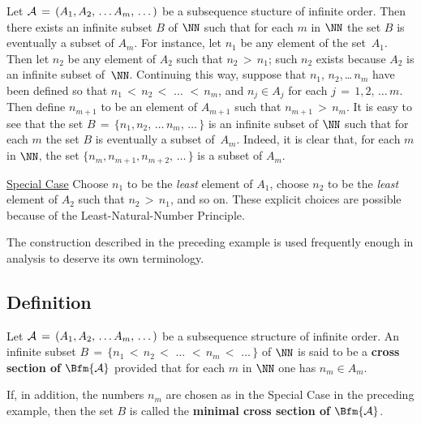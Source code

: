         Let ${\cal A} \,=\, (A_{1}, A_{2},\,{\ldots}\,A_{m},\,{\ldots}\,)$ be a subsequence stucture of infinite order.
    Then there exists an infinite subset $B$ of ${\NN}$ such that for each $m$ in ${\NN}$ the set $B$ is eventually a subset of $A_{m}$.
    For instance, let $n_{1}$ be any element of the set~$A_{1}$. Then let $n_{2}$ be any element of $A_{2}$ such that $n_{2}\,>\,n_{1}$;
    such $n_{2}$ exists because $A_{2}$ is an infinite subset of~${\NN}$. Continuing this way,
    suppose that $n_{1}$, $n_{2}$,\,{\ldots}\,$n_{m}$ have been defined so that
    $n_{1}\,<\,n_{2}\,<\,\,{\ldots}\,\,<\,n_{m}$, and $n_{j}{\in}A_{j}$ for each $j \,=\, 1,2,\,{\ldots}\,m$.
    Then define $n_{m+1}$ to be an element of $A_{m+1}$ such that $n_{m+1}\,>\,n_{m}$.
    It is easy to see that the set $B \,=\, \{n_{1}, n_{2},\,{\ldots}\,n_{m},\,{\ldots}\,\}$
    is an infinite subset of ${\NN}$ such that for each $m$ the set $B$ is eventually a subset of~$A_{m}$.
    Indeed, it is clear that, for each $m$ in ${\NN}$, the set $\{n_{m}, n_{m+1}, n_{m+2},\,{\ldots}\,\}$ is a subset of $A_{m}$.


        \underline{Special Case} Choose $n_{1}$ to be the {\em least} element of $A_{1}$,
    choose $n_{2}$ to be the {\em least} element of $A_{2}$ such that $n_{2}\,>\,n_{1}$, and so on.
    These explicit choices are possible because of the Least-Natural-Number Principle.

\VV

        The construction described in the preceding example is used frequently enough in analysis to deserve its own terminology.

\V

        \subsection{\small{{\bf Definition}}}
        \label{DefA40.60}

\V

        Let ${\cal A} \,=\, (A_{1}, A_{2},\,{\ldots}\,A_{m},\,{\ldots}\,)$ be a subsequence structure of infinite order. An infinite subset
    $B \,=\, \{n_{1}\,<\,n_{2}\,<\,\,{\ldots}\,\,<\,n_{m}\,<\,\,{\ldots}\,\}$ of ${\NN}$ is said to be a
    {\bf cross section of $\Bfm{{\cal A}}$}
    provided that for each $m$ in ${\NN}$ one has $n_{m}{\in}A_{m}$.

        If, in addition, the numbers $n_{m}$ are chosen as in the Special Case in the preceding example,
    then the set $B$ is called the {\bf minimal cross section of $\Bfm{{\cal A}}$}.



